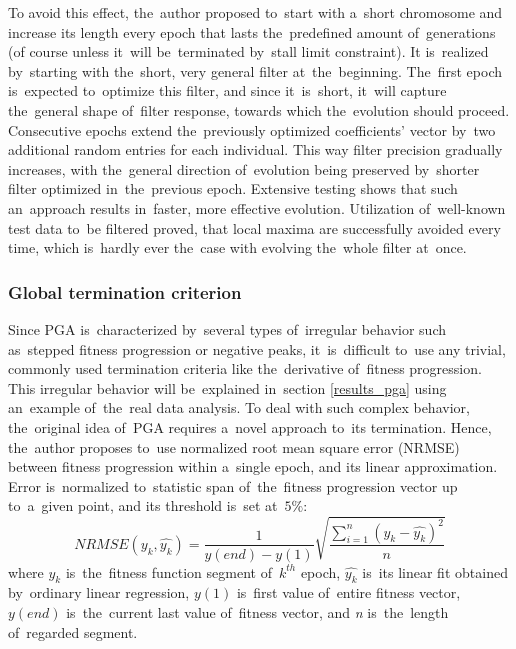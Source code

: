 To avoid this effect, the~author proposed to~start with a~short chromosome and increase its length every epoch that lasts the~predefined amount of~generations (of course unless it~will be~terminated by~stall limit constraint). It is~realized by~starting with the~short, very general filter at~the~beginning. The~first epoch is~expected to~optimize this filter, and since it~is~short, it~will capture the~general shape of~filter response, towards which the~evolution should proceed. Consecutive epochs extend the~previously optimized coefficients’ vector by~two additional random entries for each individual. This way filter precision gradually increases, with the~general direction of~evolution being preserved by~shorter filter optimized in~the~previous epoch.
Extensive testing shows that such an~approach results in~faster, more effective evolution. Utilization of~well-known test data to~be filtered proved, that local maxima are successfully avoided every time, which is~hardly ever the~case with evolving the~whole filter at~once.

\subsubsection{Global termination criterion}
Since PGA is~characterized by~several types of~irregular behavior such as~stepped fitness progression or negative peaks, it~is~difficult to~use any trivial, commonly used termination criteria like the~derivative of~fitness progression. This irregular behavior will be~explained in~section \ref{results_pga} using an~example of~the~real data analysis. To deal with such complex behavior, the~original idea of~PGA requires a~novel approach to~its termination. Hence, the~author proposes to~use normalized root mean square error (NRMSE) between fitness progression within a~single epoch, and its linear approximation. Error is~normalized to~statistic span of~the~fitness progression vector up to~a~given point, and its threshold is~set at~$5\%$:
\begin{equation}
\label{eq:spectrogram}
NRMSE(y_k,\hat{y_k})=\frac{1}{y(end) - y(1)}\sqrt{\frac{\sum_{i=1}^{n} \left(y_k - \hat{y_k} \right)^2}{n}}
\end{equation}
where $y_k$ is~the~fitness function segment of~$k^{th}$ epoch, $\hat{y_k}$ is~its linear fit obtained by~ordinary linear regression, $y(1)$ is~first value of~entire fitness vector, $y(end)$ is~the~current last value of~fitness vector, and \emph{n} is~the~length of~regarded segment.







